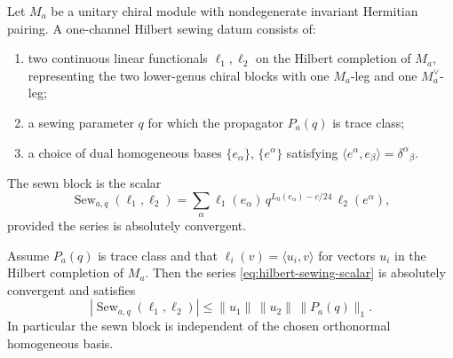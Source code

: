 \begin{definition}
\label{def:hilbert-sewing-datum}
Let \(M_a\) be a unitary chiral module with nondegenerate invariant Hermitian
pairing.  A one-channel Hilbert sewing datum consists of:
\begin{enumerate}
  \item two continuous linear functionals
  \(\ell_1,\ell_2\) on the Hilbert completion of \(M_a\), representing the
  two lower-genus chiral blocks with one \(M_a\)-leg and one \(M_a^\vee\)-leg;
  \item a sewing parameter \(q\) for which the propagator \(P_a(q)\) is
  trace class;
  \item a choice of dual homogeneous bases
  \(\{e_\alpha\}\), \(\{e^\alpha\}\) satisfying
  \(\langle e^\alpha,e_\beta\rangle=\delta^\alpha{}_\beta\).
\end{enumerate}
The sewn block is the scalar
\begin{equation}
  \operatorname{Sew}_{a,q}(\ell_1,\ell_2)
  =
  \sum_\alpha
  \ell_1(e_\alpha)\,
  q^{L_0(e_\alpha)-c/24}\,
  \ell_2(e^\alpha),
  \label{eq:hilbert-sewing-scalar}
\end{equation}
provided the series is absolutely convergent.
\end{definition}

\begin{lemma}
\label{lem:trace-class-estimate-one-channel-sewing}
Assume \(P_a(q)\) is trace class and that
\(\ell_i(v)=\langle u_i,v\rangle\) for vectors \(u_i\) in the Hilbert
completion of \(M_a\).  Then the series
\eqref{eq:hilbert-sewing-scalar} is absolutely convergent and satisfies
\begin{equation}
  \left|
    \operatorname{Sew}_{a,q}(\ell_1,\ell_2)
  \right|
  \le
  \|u_1\|\,\|u_2\|\,\|P_a(q)\|_1 .
  \label{eq:one-channel-sewing-bound}
\end{equation}
In particular the sewn block is independent of the chosen orthonormal
homogeneous basis.
\end{lemma}

